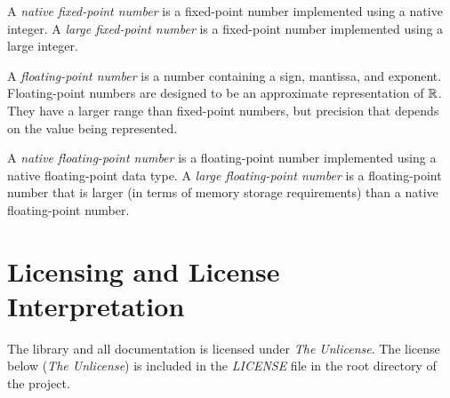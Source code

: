 A \emph{native fixed-point number} is a fixed-point number 
implemented using a native integer.  A \emph{large 
fixed-point number} is a fixed-point number implemented 
using a large integer.  

A \emph{floating-point number} 
is a number containing a sign, mantissa, and exponent.  
Floating-point numbers are designed to be an approximate 
representation of ${\mathbb{R}}$.  They have a larger range 
than fixed-point numbers, but precision that depends on the 
value being represented.  

A \emph{native floating-point number} is a floating-point 
number implemented using a native floating-point data type.  
A \emph{large floating-point number} is a floating-point 
number that is larger (in terms of memory storage 
requirements) than a native floating-point number.  


\section{Licensing and License Interpretation}
\label{ciov0:slip0}

The \emph{\productbasenameshort{}} library and all 
documentation is licensed under \emph{The Unlicense}.  The 
license below (\emph{The Unlicense}) is included in the 
\emph{LICENSE} file in the root directory of the project.  

